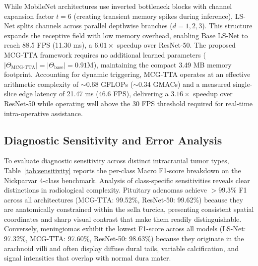 \documentclass[journal]{IEEEtran}
\begin{document}
While MobileNet architectures use inverted bottleneck blocks with channel expansion factor $t=6$ (creating transient memory spikes during inference), LS-Net splits channels across parallel depthwise branches ($d=1, 2, 3$). This structure expands the receptive field with low memory overhead, enabling Base LS-Net to reach 88.5 FPS (11.30 ms), a $6.01\times$ speedup over ResNet-50. The proposed MCG-TTA framework requires no additional learned parameters ($|\Theta_{\text{MCG-TTA}}| = |\Theta_{\text{base}}| = 0.91\text{M}$), maintaining the compact 3.49 MB memory footprint. Accounting for dynamic triggering, MCG-TTA operates at an effective arithmetic complexity of $\sim 0.68$ GFLOPs ($\sim 0.34$ GMACs) and a measured single-slice edge latency of 21.47 ms (46.6 FPS), delivering a $3.16\times$ speedup over ResNet-50 while operating well above the 30 FPS threshold required for real-time intra-operative assistance.

\subsection{Diagnostic Sensitivity and Error Analysis}

To evaluate diagnostic sensitivity across distinct intracranial tumor types, Table~\ref{tab:sensitivity} reports the per-class Macro F1-score breakdown on the Nickparvar 4-class benchmark. Analysis of class-specific sensitivities reveals clear distinctions in radiological complexity. Pituitary adenomas achieve $>99.3\%$ F1 across all architectures (MCG-TTA: 99.52\%, ResNet-50: 99.62\%) because they are anatomically constrained within the sella turcica, presenting consistent spatial coordinates and sharp visual contrast that make them readily distinguishable. Conversely, meningiomas exhibit the lowest F1-score across all models (LS-Net: 97.32\%, MCG-TTA: 97.60\%, ResNet-50: 98.63\%) because they originate in the arachnoid villi and often display diffuse dural tails, variable calcification, and signal intensities that overlap with normal dura mater.
\end{document}
